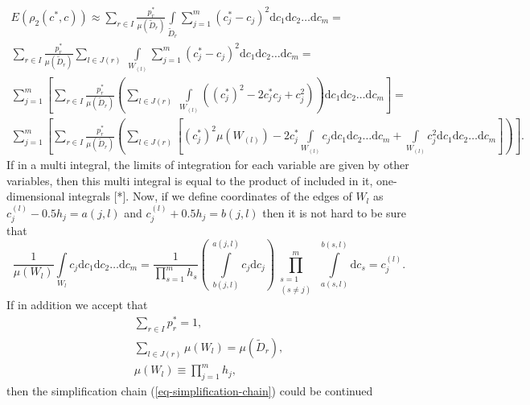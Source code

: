 \documentclass[a4paper]{article}
\numberwithin{equation}{subsection}
\begin{document}
\begin{gather}
\nonumber
E(\rho_{2}(c^{*},c)) \approx \sum\limits_{r \in I} \frac{p_{r}^{*}}{\mu(\tilde{D}_{r})} \int\limits_{\tilde{D}_{r}} \sum\limits_{j=1}^{m}(c_{j}^{*}-c_{j})^{2}\mathrm{d}c_{1}\mathrm{d}c_{2}\dots \mathrm{d}c_{m} = \\
\nonumber
\sum\limits_{r \in I} \frac{p_{r}^{*}}{\mu(\tilde{D}_{r})} \sum\limits_{l \in J(r)} \  \int\limits_{W_{(l)}} \sum\limits_{j=1}^{m}(c_{j}^{*}-c_{j})^{2}\mathrm{d}c_{1}\mathrm{d}c_{2}\dots \mathrm{d}c_{m} = \\
\nonumber
\sum\limits_{j=1}^{m}  \left[ \sum\limits_{r \in I} \frac{p_{r}^{*}}{\mu(\tilde{D}_{r})} \left( \sum\limits_{l \in J(r)} \ \int\limits_{W_{(l)}} ((c_{j}^{*})^{2}-2c_{j}^{*}c_{j}+c_{j}^{2}) \right) \mathrm{d}c_{1}\mathrm{d}c_{2}\dots \mathrm{d}c_{m} \right] = \\
\sum\limits_{j=1}^{m}  \left[ \sum\limits_{r \in I} \frac{p_{r}^{*}}{\mu(\tilde{D}_{r})} \left( \sum\limits_{l \in J(r)} \left[ (c_{j}^{*})^{2} \mu(W_{(l)}) - 2c_{j}^{*} \int\limits_{W_{(l)}} c_{j} \mathrm{d}c_{1}\mathrm{d}c_{2}\dots \mathrm{d}c_{m} + \int\limits_{W_{(l)}} c_{j}^{2} \mathrm{d}c_{1}\mathrm{d}c_{2}\dots \mathrm{d}c_{m} \right] \right) \right]. \label{eq-simplification-chain}
\end{gather}
If in a multi integral, the limits of integration for each variable are given by other variables, then this multi integral is equal to the product of included in it, one-dimensional integrals [*]. Now, if we define coordinates of the edges of $W_{l}$ as $c_{j}^{(l)} - 0.5h_{j} = a(j,l)$ and $c_{j}^{(l)} + 0.5h_{j} = b(j,l)$ then it is not hard to be sure that 
\begin{equation}
\frac{1}{\mu(W_{l})} \int\limits_{W_l} c_{j} \mathrm{d} c_{1} \mathrm{d} c_{2} \ldots  \mathrm{d} c_{m} 
	= \dfrac{1}{\prod\limits_{s=1}^{m}h_{s}}
	\left( \  \int\limits_{b(j,l)}^{a(j,l)} c_{j}  \mathrm{d} c_{j}\right) 
	\prod_{\substack{s=1\\ (s\ne j)}}^m \ 
	\int\limits_{a(s,l)}^{b(s,l)} \!  \mathrm{d} c_{s} 
	= c_{j}^{(l)}.
\end{equation}
If in addition we accept that
\begin{gather}
\sum\limits_{r \in I} p_{r}^{*} =1, \\
\sum\limits_{l \in J(r)} \mu(W_{l}) =\mu(\tilde{D}_{r}), \\
\mu(W_{l}) \equiv \prod\limits_{j=1}^{m}h_{j},
\end{gather}
then the simplification chain (\ref{eq-simplification-chain}) could be continued
\end{document}
